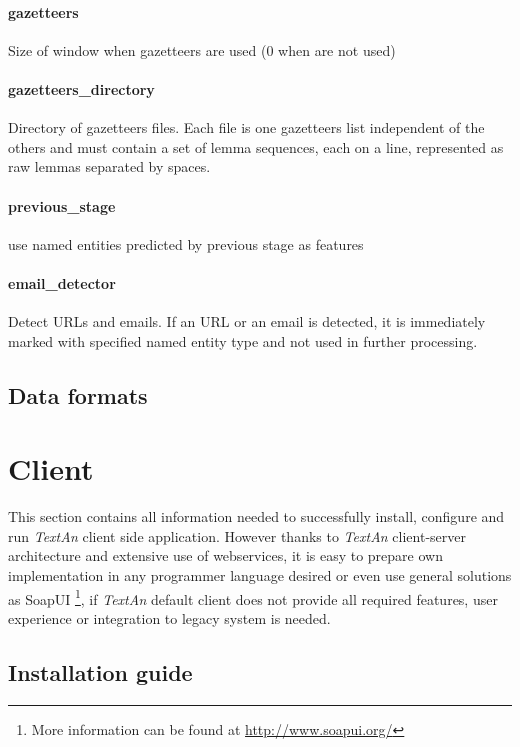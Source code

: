 \documentclass[12pt,a4paper]{report}
\newcommand{\textan}{\emph{TextAn}}
\begin{document}
\paragraph{gazetteers}
Size of window when gazetteers are used (0 when are not used)

\paragraph{gazetteers\_directory}
Directory of gazetteers files. Each file is one gazetteers list independent of the others and must contain a set of lemma sequences, each on a line, represented as raw lemmas separated by spaces.

\paragraph{previous\_stage}
use named entities predicted by previous stage as features

\paragraph{email\_detector}
Detect URLs and emails. If an URL or an email is detected, it is immediately marked with specified named entity type and not used in further processing.

\subsection{Data formats}

\section{Client}

This section contains all information needed to successfully install, configure and run \textan{} client side application.
However thanks to \textan{} client-server architecture and extensive use of webservices,
it is easy to prepare own implementation in any programmer language desired or even use general solutions as SoapUI
\footnote{More information can be found at \url{http://www.soapui.org/}},
if \textan{} default client does not provide all required features, user experience or integration to legacy system is needed.

\subsection{Installation guide}
\end{document}
